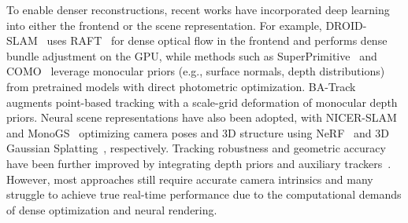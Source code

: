 To enable denser reconstructions, recent works have incorporated deep learning into either the frontend or the scene representation. For example, DROID-SLAM~\cite{teed2021droid} uses RAFT~\cite{teed2020raft} for dense optical flow in the frontend and performs dense bundle adjustment on the GPU, while methods such as SuperPrimitive~\cite{mazur2024superprimitive} and COMO~\cite{dexheimer2024compact} leverage monocular priors (e.g., surface normals, depth distributions) from pretrained models with direct photometric optimization. BA-Track~\cite{chen2025back} augments point-based tracking with a scale-grid deformation of monocular depth priors. Neural scene representations have also been adopted, with NICER-SLAM~\cite{zhu2024nicer} and MonoGS~\cite{matsuki2024gaussian} optimizing camera poses and 3D structure using NeRF~\cite{mildenhall2021nerf} and 3D Gaussian Splatting~\cite{kerbl20233dgs}, respectively. Tracking robustness and geometric accuracy have been further improved by integrating depth priors and auxiliary trackers~\cite{zhang2024glorie,sandstrom2025splat,zhang2023go,zhang2023hi,zhang2024hi}. However, most approaches still require accurate camera intrinsics and many struggle to achieve true real-time performance due to the computational demands of dense optimization and neural rendering.



